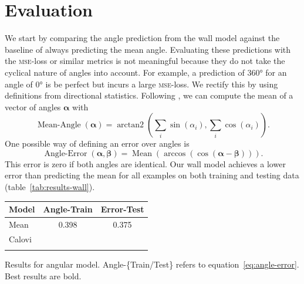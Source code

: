 \documentclass[nobib, a4paper]{tufte-handout}
\begin{document}
\section{Evaluation}
We start by comparing the angle prediction from the wall model against the baseline of always predicting the mean angle.
Evaluating these predictions with the \textsc{mse}-loss or similar metrics is not meaningful because they do not take the cyclical nature of angles into account.
For example, a prediction of \ang{360} for an angle of \ang{0} is be perfect but incurs a large \textsc{mse}-loss.
We rectify this by using definitions from directional statistics\autocite{circularStatistics}.
Following \citeauthor{circularStatistics}, we can compute the mean of a vector of angles \(\bm{\alpha}\) with
\begin{equation*}
 \operatorname{Mean-Angle}(\bm{\alpha}) = \operatorname{arctan2} \left( \sum_i \sin \left( \alpha_i \right),  \sum_i \cos \left( \alpha_i \right)  \right).
\end{equation*}
One possible way of defining an error over angles is
\begin{equation}\label{eq:angle-error}
 \operatorname{Angle-Error}(\bm{\alpha}, \bm{\beta}) = \operatorname{Mean} \left( \operatorname{arccos} \left(  \cos  (\bm{\alpha} - \bm{\beta})  \right) \right).
\end{equation}
This error is zero if both angles are identical.
Our wall model achieves a lower error than predicting the mean for all examples on both training and testing data (table~\ref{tab:results-wall}).

\begin{margintable}
\centering
\begin{tabular}{@{}lS[table-format=1.3]S[table-format=1.3]@{}}
\toprule
{Model} & {Angle-Train} & {Error-Test} \\ \midrule
Mean & 0.398 & 0.375 \\ 
  Calovi &  & \\ %
\bottomrule\\
\end{tabular}
\caption{Results for angular model.
  Angle-\{Train/Test\} refers to equation~\ref{eq:angle-error}.
  Best results are bold.
}
\label{tab:results-wall}
\end{margintable}
\end{document}
